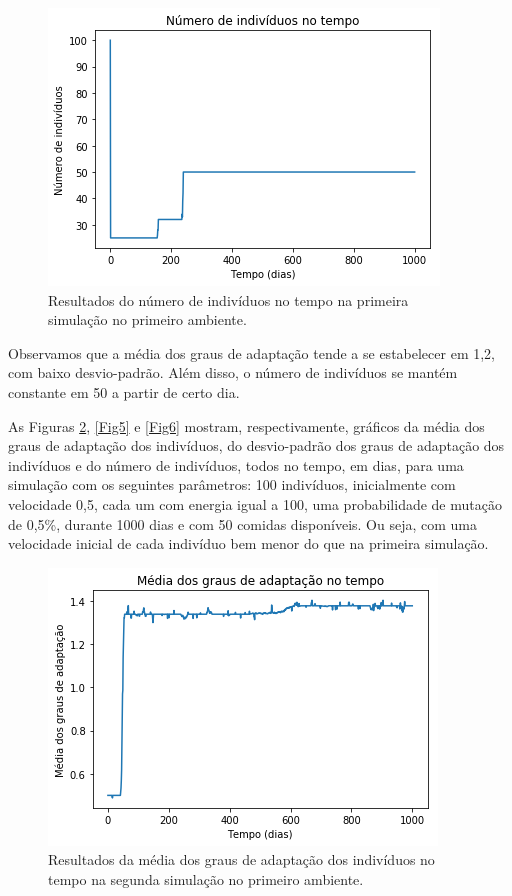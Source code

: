 \documentclass[10pt,brazil,english]{article}
\begin{document}
        \begin{figure}[!hbtp]
            \begin{center}
                \includegraphics[scale=0.5]{Images/1-3.png}
            \end{center}
            \caption{Resultados do número de indivíduos no tempo na primeira simulação no primeiro ambiente.}
            \label{Fig3}
        \end{figure}
        
        Observamos que a média dos graus de adaptação tende a se estabelecer em 1,2, com baixo desvio-padrão. Além disso, o número de indivíduos se mantém constante em 50 a partir de certo dia.
        
        As Figuras \ref{Fig4}, \ref{Fig5} e \ref{Fig6} mostram, respectivamente, gráficos da média dos graus de adaptação dos indivíduos, do desvio-padrão dos graus de adaptação dos indivíduos e do número de indivíduos, todos no tempo, em dias, para uma simulação com os seguintes parâmetros: 100 indivíduos, inicialmente com velocidade 0,5, cada um com energia igual a 100, uma probabilidade de mutação de 0,5\%, durante 1000 dias e com 50 comidas disponíveis. Ou seja, com uma velocidade inicial de cada indivíduo bem menor do que na primeira simulação.
        
        \begin{figure}[!hbtp]
            \begin{center}
                \includegraphics[scale=0.5]{Images/1-4.png}
            \end{center}
            \caption{Resultados da média dos graus de adaptação dos indivíduos no tempo na segunda simulação no primeiro ambiente.}
            \label{Fig4}
        \end{figure} 
        
\end{document}
